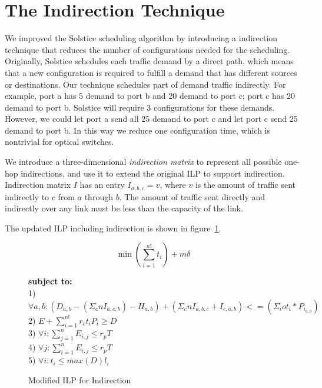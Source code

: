 \section{The Indirection Technique}
\label{sec:indirection}
We improved the Solstice scheduling
algorithm by introducing a indirection technique that reduces the number
of configurations needed for the scheduling. Originally, Solstice
schedules each traffic demand by a direct path, which means that a new
configuration is required to fulfill a demand that has different sources
or destinations. Our technique schedules part of demand traffic
indirectly. For example, port a has 5 demand to port b and 20
demand to port c; port c has 20 demand to port b. Solstice will require
3 configurations for these demands. However, we could let port a send
all 25 demand to port c and let port c send 25 demand to port b. In this
way we reduce one configuration time, which is nontrivial for optical
switches. 

We introduce a three-dimensional {\it indirection matrix} to represent all possible one-hop
indirections, and use it to extend the original ILP to support indirection. Indirection matrix
$I$ has an entry $I_{a,b,c} = v$, where $v$ is the amount of traffic sent indirectly to $c$ from $a$
through $b$. The amount of traffic sent directly and indirectly over any link must be less than
the capacity of the link.


The updated ILP including indirection is shown in figure~\ref{fig:hybrid-indirection}.


\begin{figure}[t]
\small
\centering
\begin{mdframed}
\[
\min \left(\sum_{i=1}^{n!} t_i\right) + m\delta
\]
\begin{tabbing}
\textbf{subject to:}\\[4pt]
1)  $\forall a, b: (D_{a,b} - (\Sigma_{c}{n} I_{a,c,b}) - H_{a,b})
    + (\Sigma_{c}{n} I_{a,b,c} + I_{c,a,b})
    <= (\Sigma_{i}{o} t_i * P_{i_{a,b}})$ \\[4pt]
2) $E + \sum_{i=1}^{n!} r_c t_i P_i \geq D$\\[4pt]
3) $\forall i: \sum_{j=1}^{n} E_{i,j} \leq r_p T$\\[4pt]
4) $\forall j: \sum_{i=1}^{n} E_{i,j} \leq r_p T$\\[4pt]
5) $\forall i: t_i \leq \textit{max}(D) l_i$
\end{tabbing}
\end{mdframed}
\caption{Modified ILP for Indirection}
\label{fig:hybrid-indirection}
\end{figure}


